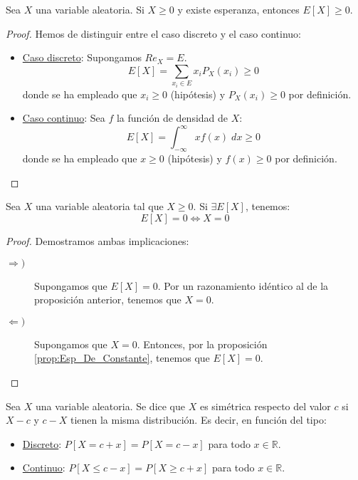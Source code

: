\begin{prop}\label{prop:6.4}
    Sea $X$ una variable aleatoria. Si $X\geq 0$ y existe esperanza, entonces $E[X]\geq 0$.
\end{prop}
\begin{proof}
    Hemos de distinguir entre el caso discreto y el caso continuo:
    \begin{itemize}
        \item \underline{Caso discreto}: Supongamos $Re_X = E$.
        \begin{equation*}
            E[X] = \sum_{x_i\in E} x_iP_X(x_i) \geq 0
        \end{equation*}
        donde se ha empleado que $x_i\geq 0$ (hipótesis) y $P_X(x_i)\geq0$ por definición.

        \item \underline{Caso continuo}: Sea $f$ la función de densidad de $X$:
        \begin{equation*}
            E[X] = \int_{-\infty}^{\infty} xf(x)\;dx \geq 0
        \end{equation*}
        donde se ha empleado que $x\geq 0$ (hipótesis) y $f(x)\geq0$ por definición.
    \end{itemize}
\end{proof}

\begin{coro}
    Sea $X$ una variable aleatoria tal que $X\geq 0$. Si $\exists E[X]$, tenemos:
    \begin{equation*}
        E[X]=0\Longleftrightarrow X=0
    \end{equation*}
\end{coro}
\begin{proof}
    Demostramos ambas implicaciones:
    \begin{description}
        \item[$\Longrightarrow)$] Supongamos que $E[X]=0$. Por un razonamiento idéntico al de la proposición anterior, tenemos que $X=0$.
        
        \item[$\Longleftarrow)$] Supongamos que $X=0$. Entonces, por la proposición \ref{prop:Esp_De_Constante}, tenemos que $E[X]=0$.
    \end{description}
\end{proof}

\begin{definicion}[Simetría]
    Sea $X$ una variable aleatoria. Se dice que $X$ es simétrica respecto del valor $c$ si $X-c$ y $c-X$ tienen la misma distribución.
    Es decir, en función del tipo:
    \begin{itemize}
        \item \underline{Discreto}: $P[X=c+x]=P[X=c-x]$ para todo $x\in \mathbb{R}$.
        \item \underline{Continuo}: $P[X\leq c-x]=P[X\geq c+x]$ para todo $x\in \mathbb{R}$.
    \end{itemize}
\end{definicion}

